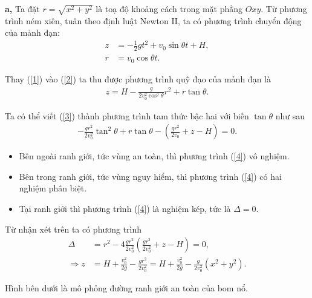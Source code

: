 \textbf{a,} Ta đặt $r = \sqrt{x^2 + y^2}$ là toạ độ khoảng cách trong mặt phẳng $Oxy$. Từ phương trình ném xiên, tuân theo định luật Newton II, ta có phương trình chuyển động của mảnh đạn:
\begin{align}
    z &= -\frac{1}{2} g t^2 + v_0 \sin \theta t + H, \label{1}\\
    r&= v_0 \cos \theta t. \label{2}
\end{align}

Thay (\ref{1}) vào (\ref{2}) ta thu được phương trình quỹ đạo của mảnh đạn là
\begin{align}
    z = H- \frac{g}{2 v_0^2 \cos^2 \theta} r^2 + r \tan \theta. \label{3}
\end{align}

Ta có thể viết (\ref{3}) thành phương trình tam thức bậc hai với biến $\tan \theta$ như sau
\begin{align}
    - \frac{g r^2}{2 v_0^2} \tan^2 \theta + r \tan \theta - \left( \frac{g r^2}{2 v_0} + z -H \right) = 0.\label{4}
\end{align}

\begin{itemize}\itemsep0em
\item Bên ngoài ranh giới, tức vùng an toàn, thì phương trình (\ref{4}) vô nghiệm.

\item Bên trong ranh giới, tức vùng nguy hiểm, thì phương trình (\ref{4}) có hai nghiệm phân biệt.

\item Tại ranh giới thì phương trình (\ref{4}) là nghiệm kép, tức là $\Delta = 0$.
\end{itemize}



Từ nhận xét trên ta có phương trình
\begin{align}
    \Delta &= r^2 - 4 \frac{gr^2}{2 v_0^2} \left( \frac{gr^2}{2v_0^2} + z-H \right) = 0,\\
    \Rightarrow z &= H + \frac{v_0^2}{2g} - \frac{gr^2}{2 v_0^2} = H + \frac{v_0^2}{2g} - \frac{g}{2 v_0^2} (x^2 + y^2).\label{10}
\end{align}

Hình bên dưới là mô phỏng đường ranh giới an toàn của bom nổ.

